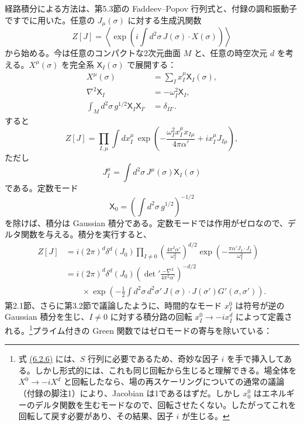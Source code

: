 経路積分による方法は、第5.3節の Faddeev--Popov 行列式と、付録の調和振動子ですでに用いた。任意の $J_\mu(\sigma)$ に対する生成汎関数
\begin{equation}
Z[J]=\left\langle\exp\left(i\int d^2\sigma\,J(\sigma)\cdot X(\sigma)\right)\right\rangle
\tag{6.2.1}\label{eq:6.2.1}
\end{equation}
から始める。今は任意のコンパクトな2次元曲面 $M$ と、任意の時空次元 $d$ を考える。$X^\mu(\sigma)$ を完全系 $\mathsf X_I(\sigma)$ で展開する：
\begin{align}
X^\mu(\sigma)&=\sum_I x_I^\mu\mathsf X_I(\sigma),
\tag{6.2.2a}\label{eq:6.2.2a}\\
\nabla^2\mathsf X_I&=-\omega_I^2\mathsf X_I,
\tag{6.2.2b}\label{eq:6.2.2b}\\
\int_M d^2\sigma\,g^{1/2}\mathsf X_I\mathsf X_{I'}&=\delta_{II'}.
\tag{6.2.2c}\label{eq:6.2.2c}
\end{align}
すると
\begin{equation}
Z[J]=\prod_{I,\mu}\int dx_I^\mu\,
\exp\left(-\frac{\omega_I^2x_I^\mu x_{I\mu}}{4\pi\alpha'}+ix_I^\mu J_{I\mu}\right),
\tag{6.2.3}\label{eq:6.2.3}
\end{equation}
ただし
\begin{equation}
J_I^\mu=\int d^2\sigma\,J^\mu(\sigma)\mathsf X_I(\sigma)
\tag{6.2.4}\label{eq:6.2.4}
\end{equation}
である。定数モード
\begin{equation}
\mathsf X_0=\left(\int d^2\sigma\,g^{1/2}\right)^{-1/2}
\tag{6.2.5}\label{eq:6.2.5}
\end{equation}
を除けば、積分は Gaussian 積分である。定数モードでは作用がゼロなので、デルタ関数を与える。積分を実行すると、
\begin{equation}
\begin{aligned}
Z[J]&=i(2\pi)^d\delta^d(J_0)\prod_{I\ne0}
\left(\frac{4\pi^2\alpha'}{\omega_I^2}\right)^{d/2}
\exp\left(-\frac{\pi\alpha'J_I\cdot J_I}{\omega_I^2}\right)\\
&=i(2\pi)^d\delta^d(J_0)
\left(\det{}'\frac{-\nabla^2}{4\pi^2\alpha'}\right)^{-d/2}\\
&\qquad\times\exp\left(-\frac12\int d^2\sigma\,d^2\sigma'\,
J(\sigma)\cdot J(\sigma')G'(\sigma,\sigma')\right).
\end{aligned}
\tag{6.2.6}\label{eq:6.2.6}
\end{equation}
第2.1節、さらに第3.2節で議論したように、時間的なモード $x_I^0$ は符号が逆の Gaussian 積分を生じ、$I\ne0$ に対する積分路の回転 $x_I^0\to-ix_I^d$ によって定義される。\footnote[1]{式 \hyperref[eq:6.2.6]{(6.2.6)} には、$S$ 行列に必要であるため、奇妙な因子 $i$ を手で挿入してある。しかし形式的には、これも同じ回転から生じると理解できる。場全体を $X^0\to-iX^d$ と回転したなら、場の再スケーリングについての通常の議論（付録の脚注1）により、Jacobian は1であるはずだ。しかし $x_0^0$ はエネルギーのデルタ関数を生むモードなので、回転させたくない。したがってこれを回転して戻す必要があり、その結果、因子 $i$ が生じる。}プライム付きの Green 関数ではゼロモードの寄与を除いている：
